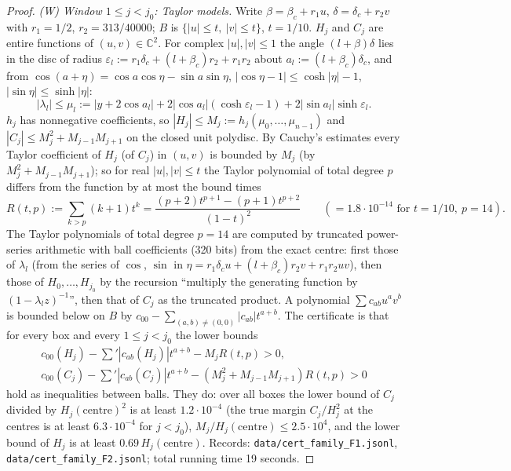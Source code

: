 \documentclass[11pt,a4paper]{article}
\theoremstyle{definition}
\begin{document}
\begin{proof}
\emph{(W) Window $1\le j<j_0$: Taylor models.} Write $\beta=\beta_c+r_1u$, $\delta=\delta_c+r_2v$ with $r_1=1/2$, $r_2=313/40000$; $B$ is $\{|u|\le t,\ |v|\le t\}$, $t=1/10$. $H_j$ and $C_j$ are entire functions of $(u,v)\in\mathbb C^2$. For complex $|u|,|v|\le1$ the angle $(l+\beta)\delta$ lies in the disc of radius $\varepsilon_l:=r_1\delta_c+(l+\beta_c)r_2+r_1r_2$ about $a_l:=(l+\beta_c)\delta_c$, and from $\cos(a+\eta)=\cos a\cos\eta-\sin a\sin\eta$, $|\cos\eta-1|\le\cosh|\eta|-1$, $|\sin\eta|\le\sinh|\eta|$:
\[
|\lambda_l|\le\mu_l:=|y+2\cos a_l|+2|\cos a_l|(\cosh\varepsilon_l-1)+2|\sin a_l|\sinh\varepsilon_l .
\]
$h_j$ has nonnegative coefficients, so $|H_j|\le M_j:=h_j(\mu_0,\dots,\mu_{n-1})$ and $|C_j|\le M_j^2+M_{j-1}M_{j+1}$ on the closed unit polydisc. By Cauchy's estimates every Taylor coefficient of $H_j$ (of $C_j$) in $(u,v)$ is bounded by $M_j$ (by $M_j^2+M_{j-1}M_{j+1}$); so for real $|u|,|v|\le t$ the Taylor polynomial of total degree $p$ differs from the function by at most the bound times
\[
R(t,p):=\sum_{k>p}(k+1)t^k=\frac{(p+2)t^{p+1}-(p+1)t^{p+2}}{(1-t)^2}\qquad(=1.8\cdot10^{-14}\text{ for }t=1/10,\ p=14).
\]
The Taylor polynomials of total degree $p=14$ are computed by truncated power-series arithmetic with ball coefficients (320 bits) from the exact centre: first those of $\lambda_l$ (from the series of $\cos$, $\sin$ in $\eta=r_1\delta_cu+(l+\beta_c)r_2v+r_1r_2uv$), then those of $H_0,\dots,H_{j_0}$ by the recursion ``multiply the generating function by $(1-\lambda_lz)^{-1}$'', then that of $C_j$ as the truncated product. A polynomial $\sum c_{ab}u^av^b$ is bounded below on $B$ by $c_{00}-\sum_{(a,b)\ne(0,0)}|c_{ab}|t^{a+b}$. The certificate is that for every box and every $1\le j<j_0$ the lower bounds
\begin{gather*}
c_{00}(H_j)-\sum\nolimits'|c_{ab}(H_j)|t^{a+b}-M_jR(t,p)>0,\\
c_{00}(C_j)-\sum\nolimits'|c_{ab}(C_j)|t^{a+b}-(M_j^2+M_{j-1}M_{j+1})R(t,p)>0
\end{gather*}
hold as inequalities between balls. They do: over all boxes the lower bound of $C_j$ divided by $H_j(\text{centre})^2$ is at least $1.2\cdot10^{-4}$ (the true margin $C_j/H_j^2$ at the centres is at least $6.3\cdot10^{-4}$ for $j<j_0$), $M_j/H_j(\text{centre})\le2.5\cdot10^4$, and the lower bound of $H_j$ is at least $0.69\,H_j(\text{centre})$. Records: \texttt{data/cert\_family\_F1.jsonl}, \texttt{data/cert\_family\_F2.jsonl}; total running time 19 seconds.
\end{proof}
\end{document}
